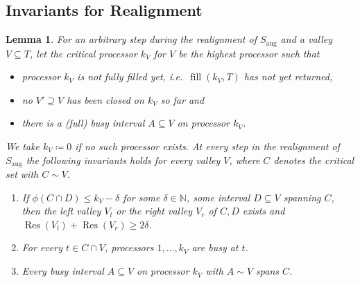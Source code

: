 \documentclass[a4paper]{article}
\DeclareMathOperator{\aug}{aug}
\DeclareMathOperator{\fillop}{fill}
\DeclareMathOperator{\res}{Res}
\newtheorem{lemma}[theorem]{Lemma}
\begin{document}
\subsection{Invariants for Realignment}
\begin{lemma}\label{lemma:invariant}
  For an arbitrary step during the realignment of $S_{\aug}$ and a valley $V \subseteq T$, let the \emph{critical processor $k_V$ for $V$} be the highest processor such that
  \begin{itemize}
    \item
      processor $k_V$ is not fully filled yet, i.e.\ $\fillop(k_V, T)$ has not yet returned,
    \item
      no $V' \supseteq V$ has been closed on $k_V$ so far and
    \item
      there is a (full) busy interval $A \subseteq V$ on processor $k_V$.
  \end{itemize}
  We take $k_V \coloneqq 0$ if no such processor exists.
  At every step in the realignment of $S_{\aug}$ the following invariants holds for every valley $V$, where $C$ denotes the critical set with $C \sim V$.
  \begin{enumerate}
    \item
      If $\phi(C \cap D) \leq k_V - \delta$ for some $\delta \in \mathbb{N}$, some interval $D \subseteq V$ spanning $C$, then the left valley $V_l$ or the right valley $V_r$ of $C, D$ exists and $\res(V_l) + \res(V_r) \geq 2 \delta$.
    \item
      For every $t \in C \cap V$, processors $1, \ldots, k_V$ are busy at $t$.
    \item
      Every busy interval $A \subseteq V$ on processor $k_V$ with $A \sim V$ spans $C$.
  \end{enumerate}
\end{lemma}
\end{document}
